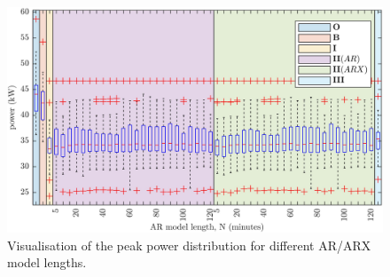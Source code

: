 \begin{figure}\centering
	\includegraphics{_chapter2/fig/ar-length-peak-comparison-1}
	\caption{Visualisation of the peak power distribution for different AR/ARX model lengths.}
	\label{ch2:fig:boxplot-multi-length}
\end{figure}